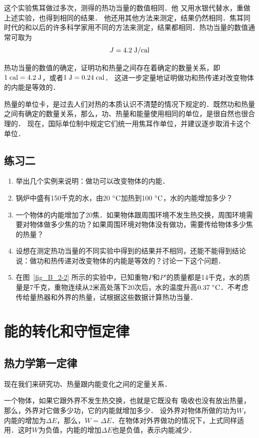 这个实验焦耳做过多次，测得的热功当量的数值相同．他
又用水银代替水，重做上述实验，也得到相同的结果．
他还用其他方法来测定，结果仍然相同．焦耳同时代的和以后的许多科学家用不同的方法来测定，结果都相同．热功当量的数值通常可取为
\[ J=4.2 \;\text{J}/\text{cal} \]

热功当量的数值的确定，证明功和热量之间存在着确定的数量关系，即$1 \;\text{cal} =4.2 \;\text{J} $，或者$1 \;\text{J}=0.24 \;\text{cal}$．
这进一步定量地证明做功和热传递对改变物体的内能是等效的．

热量的单位卡，是过去人们对热的本质认识不清楚的情况下规定的．既然功和热量之间有确定的数量关系，那么，功、热量和能量使用相同的单位，是很自然也很合理的．
现在，国际单位制中规定它们统一用焦耳作单位，并建议逐步取消卡这个单位．

\subsection*{练习二}
\begin{enumerate}
\item 举出几个实例来说明：做功可以改变物体的内能．
\item 锅炉中盛有150千克的水，由20$\;{}^\circ\text{C}$加热到100$\;{}^\circ\text{C}$，水的内能增加多少？
\item 一个物体的内能增加了20焦．如果物体跟周围环境不发生热交换，周围环境需要对物体做多少焦的功？如果周围环境对物体没有做功，需要传给物体多少焦的热量？
\item 设想在测定热功当量的不同实验中得到的结果并不相同，还能不能得到结论说：做功和热传递对改变物体的内能是等效的？讨论一下这个问题．
\item 在图~\ref{fig_B_2-2} 所示的实验中，已知重物$P$和$P'$的质量都是14千克，水的质量是7千克，重物连续从2米高处落下20次后，水的温度升高$0.37 \;{}^\circ\text{C}$．不考虑传给量热器和外界的热量，试根据这些数据计算热功当量．
\end{enumerate}



\section{能的转化和守恒定律}
\subsection{热力学第一定律} 

现在我们来研究功、热量跟内能变化之间的定量关系．

一个物体，如果它跟外界不发生热交换，也就是它既没有
吸收也没有放出热量，那么，外界对它做多少功，它的内能就增加多少．
设外界对物体所做的功为$W$，内能的增加为$\Delta E$，那么，$W=\Delta E$．在物体对外界做功的情况下，上式同样适用．这时$W$为负值，内能的增加$\Delta E$也是负值，表示内能减少．

